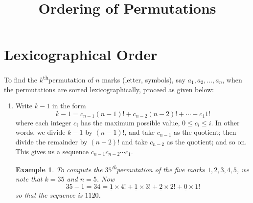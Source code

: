 \documentclass[svgnames]{article}
\title{Ordering of Permutations}
\date{}
\renewcommand{\th}{\textsuperscript{th}}
\newtheorem{Example}{Example}
\begin{document}
\maketitle

\section{Lexicographical Order}
To find the $k$\th permutation of $n$ marks (letter, symbols), say $a_1, a_2, \ldots, a_n$, when the permutations are sorted lexicographically, proceed as given below:
\begin{enumerate}
\item Write $k - 1$ in the form
\begin{equation*}
k - 1 = c_{n-1}(n - 1)! + c_{n-2}(n-2)! + \cdots + c_1 1!	
\end{equation*}
where each integer $c_i$ has the maximum possible value, $0 \le c_i \le i$. In other words, we divide $k - 1$ by $(n - 1)!$, and take $c_{n-1}$ as the quotient; then divide the remainder by $(n - 2)!$ and take $c_{n-2}$ as the quotient; and so on. This gives us a sequence $c_{n-1} c_{n-2} \cdots c_1$.
\begin{Example}
To compute the $35$\th permutation of the five marks $1, 2, 3, 4, 5$, we note that $k = 35$ and $n = 5$. Now
\begin{equation*}
35 - 1 = 34 = \underline 1 \times 4! + \underline 1 \times 3! + \underline 2 \times 2! + \underline 0 \times 1!
\end{equation*}
so that the sequence is $\boxed{1120}$.
\end{Example}


\end{enumerate}
\end{document}
